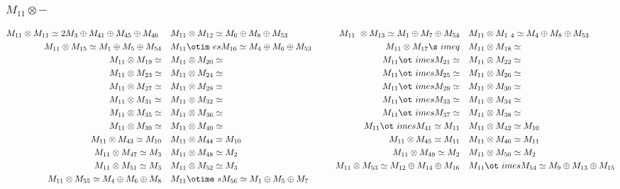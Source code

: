 \subsubsection{$M_11\otimes -$}
\begin{align*}
M_{11} \otimes M_{11} \simeq 2 M_{3} \oplus M_{41} \oplus M_{45} \oplus M_{46}\
 &&& M_{11} \otimes M_{12} \simeq M_{6} \oplus M_{8} \oplus M_{53} &&& M_{11} \
\otimes M_{13} \simeq M_{1} \oplus M_{7} \oplus M_{54} &&& M_{11} \otimes M_{1\
4} \simeq M_{4} \oplus M_{8} \oplus M_{53}\\
M_{11} \otimes M_{15} \simeq M_{1} \oplus M_{5} \oplus M_{54} &&& M_{11} \otim\
es M_{16} \simeq M_{4} \oplus M_{6} \oplus M_{53} &&& M_{11} \otimes M_{17} \s\
imeq  &&& M_{11} \otimes M_{18} \simeq \\
M_{11} \otimes M_{19} \simeq  &&& M_{11} \otimes M_{20} \simeq  &&& M_{11} \ot\
imes M_{21} \simeq  &&& M_{11} \otimes M_{22} \simeq \\
M_{11} \otimes M_{23} \simeq  &&& M_{11} \otimes M_{24} \simeq  &&& M_{11} \ot\
imes M_{25} \simeq  &&& M_{11} \otimes M_{26} \simeq \\
M_{11} \otimes M_{27} \simeq  &&& M_{11} \otimes M_{28} \simeq  &&& M_{11} \ot\
imes M_{29} \simeq  &&& M_{11} \otimes M_{30} \simeq \\
M_{11} \otimes M_{31} \simeq  &&& M_{11} \otimes M_{32} \simeq  &&& M_{11} \ot\
imes M_{33} \simeq  &&& M_{11} \otimes M_{34} \simeq \\
M_{11} \otimes M_{35} \simeq  &&& M_{11} \otimes M_{36} \simeq  &&& M_{11} \ot\
imes M_{37} \simeq  &&& M_{11} \otimes M_{38} \simeq \\
M_{11} \otimes M_{39} \simeq  &&& M_{11} \otimes M_{40} \simeq  &&& M_{11} \ot\
imes M_{41} \simeq M_{11} &&& M_{11} \otimes M_{42} \simeq M_{10}\\
M_{11} \otimes M_{43} \simeq M_{10} &&& M_{11} \otimes M_{44} \simeq M_{10} &&\
& M_{11} \otimes M_{45} \simeq M_{11} &&& M_{11} \otimes M_{46} \simeq M_{11}\
\\
M_{11} \otimes M_{47} \simeq M_{3} &&& M_{11} \otimes M_{48} \simeq M_{2} &&& \
M_{11} \otimes M_{49} \simeq M_{2} &&& M_{11} \otimes M_{50} \simeq M_{2}\\
M_{11} \otimes M_{51} \simeq M_{3} &&& M_{11} \otimes M_{52} \simeq M_{3} &&& \
M_{11} \otimes M_{53} \simeq M_{12} \oplus M_{14} \oplus M_{16} &&& M_{11} \ot\
imes M_{54} \simeq M_{9} \oplus M_{13} \oplus M_{15}\\
M_{11} \otimes M_{55} \simeq M_{4} \oplus M_{6} \oplus M_{8} &&& M_{11} \otime\
s M_{56} \simeq M_{1} \oplus M_{5} \oplus M_{7}\\
\end{align*}


